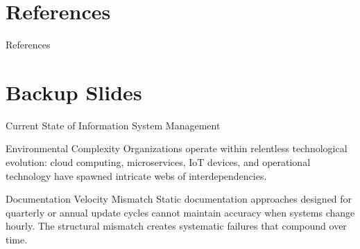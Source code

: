 \documentclass{beamer}
\begin{document}

\section{References}
\begin{frame}[allowframebreaks]{References}
  \nocite{*}
  \printbibliography[title={References}]
\end{frame}


\appendix
\section{Backup Slides}

\begin{frame}[allowframebreaks]{Current State of Information System Management}
  \begin{block}{Environmental Complexity}
    Organizations operate within relentless technological evolution: cloud computing, microservices, IoT devices, and operational technology have spawned intricate webs of interdependencies.
  \end{block}

  \begin{block}{Documentation Velocity Mismatch}
    Static documentation approaches designed for quarterly or annual update cycles cannot maintain accuracy when systems change hourly. The structural mismatch creates systematic failures that compound over time.
  \end{block}
\end{frame}
\end{document}
